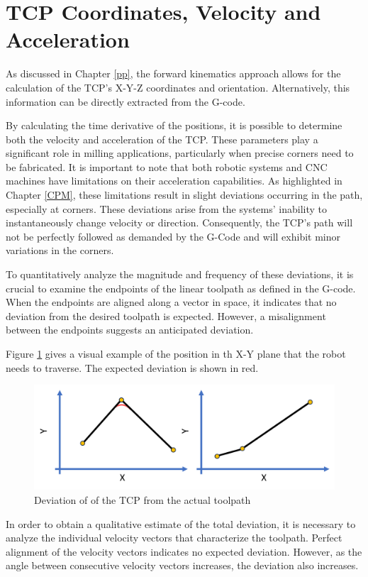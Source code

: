 \section{TCP Coordinates, Velocity and Acceleration}\label{CVA}
As discussed in Chapter \ref{pp}, the forward kinematics approach allows for the calculation of the TCP's X-Y-Z coordinates and orientation. Alternatively, this information can be directly extracted from the G-code.

By calculating the time derivative of the positions, it is possible to determine both the velocity and acceleration of the TCP. These parameters play a significant role in milling applications, particularly when precise corners need to be fabricated. It is important to note that both robotic systems and CNC machines have limitations on their acceleration capabilities. As highlighted in Chapter \ref{CPM}, these limitations result in slight deviations occurring in the path, especially at corners. These deviations arise from the systems' inability to instantaneously change velocity or direction. Consequently, the TCP's path will not be perfectly followed as demanded by the G-Code and will exhibit minor variations in the corners.

To quantitatively analyze the magnitude and frequency of these deviations, it is crucial to examine the endpoints of the linear toolpath as defined in the G-code. When the endpoints are aligned along a vector in space, it indicates that no deviation from the desired toolpath is expected. However, a misalignment between the endpoints suggests an anticipated deviation.

Figure \ref{devi} gives a visual example of the position in th X-Y plane that the robot needs to traverse. The expected deviation is shown in red.

\begin{figure}[H]
	\centerline{\includegraphics[width=.651\textwidth]{figures/uber.png}}
	\caption{Deviation of of the TCP from the actual toolpath}
	\label{devi}
\end{figure}

In order to obtain a qualitative estimate of the total deviation, it is necessary to analyze the individual velocity vectors that characterize the toolpath. Perfect alignment of the velocity vectors indicates no expected deviation. However, as the angle between consecutive velocity vectors increases, the deviation also increases.

